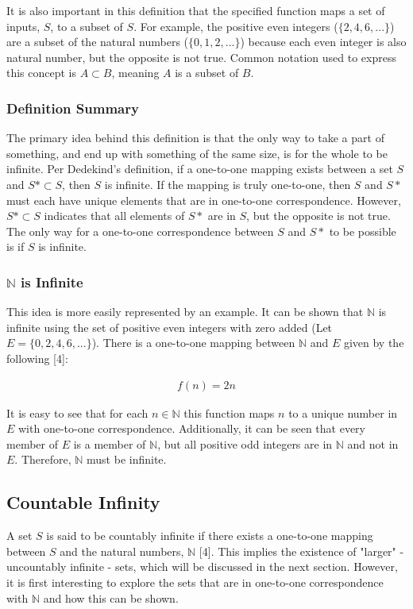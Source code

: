 \documentclass{article}
\begin{document}
It is also important in this definition that the specified function maps a set of inputs, $S$, to a subset of $S$.  For example, the positive even integers ($\{2, 4, 6, ...\}$) are a subset of the natural numbers ($\{0, 1, 2, ...\}$) because each even integer is also natural number, but the opposite is not true.  Common notation used to express this concept is $A \subset B$, meaning $A$ is a subset of $B$.

\subsubsection{Definition Summary}
The primary idea behind this definition is that the only way to take a part of something, and end up with something of the same size, is for the whole to be infinite.  Per Dedekind's definition, if a one-to-one mapping exists between a set $S$ and $S* \subset S$, then $S$ is infinite.  If the mapping is truly one-to-one, then $S$ and $S*$ must each have unique elements that are in one-to-one correspondence.  However, $S* \subset S$ indicates that all elements of $S*$ are in $S$, but the opposite is not true.  The only way for a one-to-one correspondence between $S$ and $S*$ to be possible is if $S$ is infinite.

\subsubsection{$\mathbb{N}$ is Infinite}
This idea is more easily represented by an example.  It can be shown that $\mathbb{N}$ is infinite using the set of positive even integers with zero added (Let $E = \{0, 2, 4, 6, ...\}$).  There is a one-to-one mapping between $\mathbb{N}$ and $E$ given by the following [4]:

\begin{gather*}
f(n) = 2n
\end{gather*}

It is easy to see that for each $n \in \mathbb{N}$ this function maps $n$ to a unique number in $E$ with one-to-one correspondence.  Additionally, it can be seen that every member of $E$ is a member of $\mathbb{N}$, but all positive odd integers are in $\mathbb{N}$ and not in $E$. Therefore, $\mathbb{N}$  must be infinite.

\subsection{Countable Infinity}
A set $S$ is said to be countably infinite if there exists a one-to-one mapping between $S$ and the natural numbers, $\mathbb{N}$ [4].  This implies the existence of "larger" - uncountably infinite - sets, which will be discussed in the next section.  However, it is first interesting to explore the sets that are in one-to-one correspondence with $\mathbb{N}$ and how this can be shown.
\end{document}

